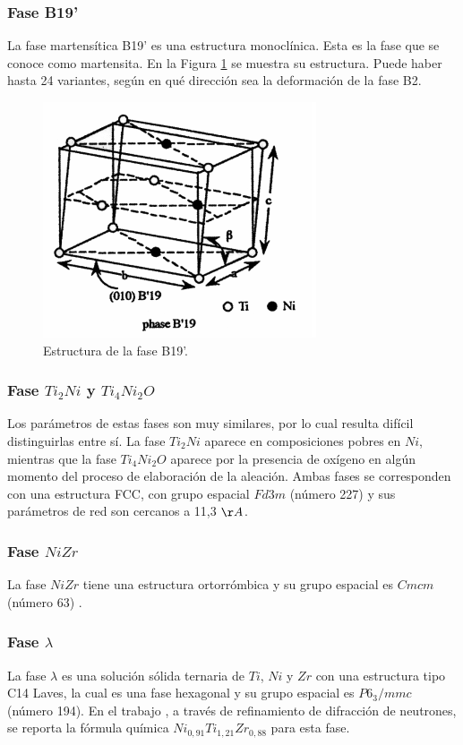 \documentclass[12pt]{article}
\theoremstyle{definition}
\theoremstyle{remark}
\begin{document}
\subsubsection{Fase B19'}
La fase martensítica B19' es una estructura monoclínica. Esta es la fase que se conoce como martensita. En la Figura \ref{B19pPhase} se muestra su estructura. Puede haber hasta 24 variantes, según en qué dirección sea la deformación de la fase B2.
\begin{figure}[H]
	\centering
	\includegraphics[scale=0.5]{img/B19pPhase.png}
	\caption{Estructura de la fase B19'.}
	\label{B19pPhase}
\end{figure}

\subsubsection{Fase $Ti_2Ni$ y $Ti_4Ni_2O$}
\label{Ti2Ni}
Los parámetros de estas fases son muy similares, por lo cual resulta difícil distinguirlas entre sí. La fase $Ti_2Ni$ aparece en composiciones pobres en $Ni$, mientras que la fase $Ti_4Ni_2O$ aparece por la presencia de oxígeno en algún momento del proceso de elaboración de la aleación. Ambas fases se corresponden con una estructura FCC, con grupo espacial $Fd3m$ (número 227) y sus parámetros de red son cercanos a 11,3 $\AA$.

\subsubsection{Fase $NiZr$}
La fase $NiZr$ tiene una estructura ortorrómbica y su grupo espacial es $Cmcm$ (número 63) \cite{Kirkpatrick1962}.

\subsubsection{Fase $\lambda$}
La fase $\lambda$ es una solución sólida ternaria de $Ti$, $Ni$ y $Zr$ con una estructura tipo C14 Laves, la cual es una fase hexagonal y su grupo espacial es $P6_3/mmc$ (número 194). En el trabajo \cite{Bououdina2003}, a través de refinamiento de difracción de neutrones, se reporta la fórmula química $Ni_{0,91}Ti_{1,21}Zr_{0,88}$ para esta fase.
\end{document}
